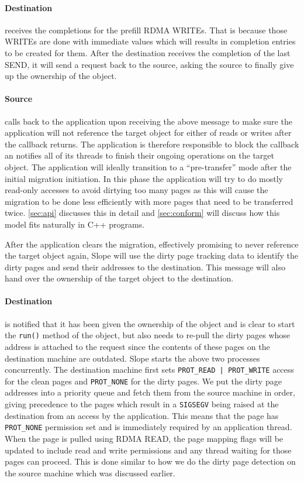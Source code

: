 \paragraph{Destination} receives the completions for the prefill RDMA WRITEs.
That is because those WRITEs are done with immediate values which will results
in completion entries to be created for them. After the destination
receives the completion of the
last SEND, it will send a request back to the source, asking the source to
finally give up the ownership of the object.

\paragraph{Source} calls back to the application upon receiving the above
message to make sure the application will not reference the target object
for either of reads or writes after the callback returns. The application is
therefore responsible to block the callback an notifies all of its threads to
finish their ongoing operations on the target object. The application will
ideally transition to a ``pre-transfer'' mode after the initial migration
initiation. In this phase the application will try to do mostly read-only
accesses to avoid dirtying too many pages as this will cause the migration
to be done less efficiently with more pages that need to be transferred twice.
\autoref{sec:api} discusses this in detail and \autoref{sec:conform} will
discuss how this model fits naturally in C++ programs.

After the application clears the migration, effectively promising to never
reference the target object again, Slope will use the dirty
page tracking data to identify the dirty pages and send their addresses
to the destination. This message will also hand over the ownership
of the target object to the destination.

\paragraph{Destination} is notified that it has been given the ownership of
the object and is clear to start the \texttt{run()} method of the object,
but also needs to re-pull the dirty pages whose address is attached to the
request since the contents of these pages on the destination machine are
outdated.
Slope starts the above two processes concurrently. The destination machine
first sets
\texttt{PROT\_READ | PROT\_WRITE} access for the clean pages and
\texttt{PROT\_NONE} for the dirty pages. We put the dirty page addresses into 
a priority queue and fetch them from the source machine in order, giving
precedence to the pages which result in a
\texttt{SIGSEGV} being raised at the destination from an access by the
application. This means that the page has \texttt{PROT\_NONE} permission set and
is immediately required by an application thread. When the page is pulled using
RDMA READ, the page mapping flags will be updated to include read and write
permissions and any thread waiting for those pages can proceed. This is done
similar to how we do the dirty page detection on the source machine which was
discussed earlier.

